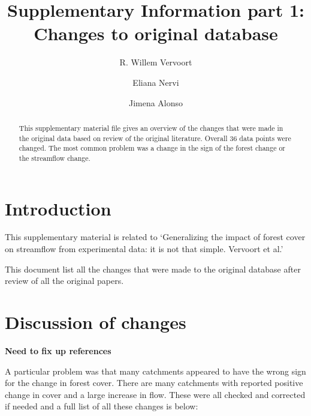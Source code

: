 \documentclass[]{elsarticle} %
\begin{document}
\begin{frontmatter}

  \title{Supplementary Information part 1: Changes to original database}
    \author[]{R. Willem Vervoort%
  }
    \author[]{Eliana Nervi}
    \author[]{Jimena Alonso}
  
  \begin{abstract}
  This supplementary material file gives an overview of the changes that were made in the original data based on review of the original literature. Overall 36 data points were changed. The most common problem was a change in the sign of the forest change or the streamflow change.
  \end{abstract}
  
 \end{frontmatter}

\hypertarget{introduction}{%
\section{Introduction}\label{introduction}}

This supplementary material is related to `Generalizing the impact of forest cover on streamflow from experimental data: it is not that simple. Vervoort et al.'

This document list all the changes that were made to the original \citet{zhang2017} database after review of all the original papers.

\hypertarget{discussion-of-changes}{%
\section{Discussion of changes}\label{discussion-of-changes}}

\textbf{Need to fix up references}

A particular problem was that many catchments appeared to have the wrong sign for the change in forest cover. There are many catchments with reported positive change in cover and a large increase in flow. These were all checked and corrected if needed and a full list of all these changes is below:
\end{document}

